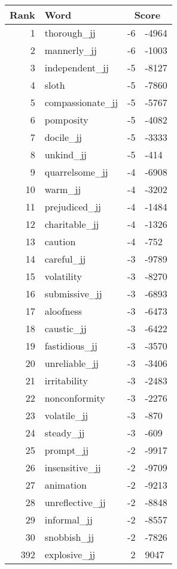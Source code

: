 \begin{longtable}[!htbp]{| rlr@{.}l |}
    \hline
    \textbf{Rank} & \textbf{Word} & \multicolumn{2}{c|}{\textbf{Score}} \\
    \hline
    \endhead
    1 & thorough\_jj & -6 & -4964 \\
    2 & mannerly\_jj & -6 & -1003 \\
    3 & independent\_jj & -5 & -8127 \\
    4 & sloth & -5 & -7860 \\
    5 & compassionate\_jj & -5 & -5767 \\
    6 & pomposity & -5 & -4082 \\
    7 & docile\_jj & -5 & -3333 \\
    8 & unkind\_jj & -5 & -414 \\
    9 & quarrelsome\_jj & -4 & -6908 \\
    10 & warm\_jj & -4 & -3202 \\
    11 & prejudiced\_jj & -4 & -1484 \\
    12 & charitable\_jj & -4 & -1326 \\
    13 & caution & -4 & -752 \\
    14 & careful\_jj & -3 & -9789 \\
    15 & volatility & -3 & -8270 \\
    16 & submissive\_jj & -3 & -6893 \\
    17 & aloofness & -3 & -6473 \\
    18 & caustic\_jj & -3 & -6422 \\
    19 & fastidious\_jj & -3 & -3570 \\
    20 & unreliable\_jj & -3 & -3406 \\
    21 & irritability & -3 & -2483 \\
    22 & nonconformity & -3 & -2276 \\
    23 & volatile\_jj & -3 & -870 \\
    24 & steady\_jj & -3 & -609 \\
    25 & prompt\_jj & -2 & -9917 \\
    26 & insensitive\_jj & -2 & -9709 \\
    27 & animation & -2 & -9213 \\
    28 & unreflective\_jj & -2 & -8848 \\
    29 & informal\_jj & -2 & -8557 \\
    30 & snobbish\_jj & -2 & -7826 \\
    392 & explosive\_jj & 2 & 9047 \\

\end{longtable}
